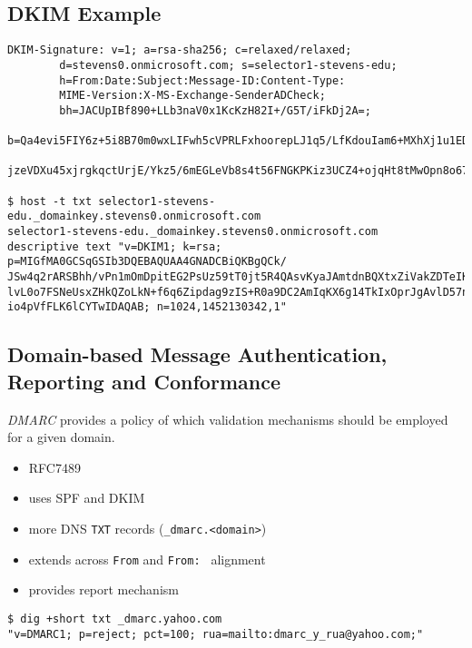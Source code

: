 \documentclass[xga]{xdvislides}
\begin{document}
\subsection{DKIM Example}
\begin{verbatim}
DKIM-Signature: v=1; a=rsa-sha256; c=relaxed/relaxed;                                               
        d=stevens0.onmicrosoft.com; s=selector1-stevens-edu;                                        
        h=From:Date:Subject:Message-ID:Content-Type:
        MIME-Version:X-MS-Exchange-SenderADCheck;       
        bh=JACUpIBf890+LLb3naV0x1KcKzH82I+/G5T/iFkDj2A=;                                            
        b=Qa4evi5FIY6z+5i8B70m0wxLIFwh5cVPRLFxhoorepLJ1q5/LfKdouIam6+MXhXj1u1EDmG
        jzeVDXu45xjrgkqctUrjE/Ykz5/6mEGLeVb8s4t56FNGKPKiz3UCZ4+ojqHt8tMwOpn8o675Kwa68nCISUP9I740jd0V6eLRNGSQ=                  

$ host -t txt selector1-stevens-edu._domainkey.stevens0.onmicrosoft.com
selector1-stevens-edu._domainkey.stevens0.onmicrosoft.com
descriptive text "v=DKIM1; k=rsa; p=MIGfMA0GCSqGSIb3DQEBAQUAA4GNADCBiQKBgQCk/
JSw4q2rARSBhh/vPn1mOmDpitEG2PsUz59tT0jt5R4QAsvKyaJAmtdnBQXtxZiVakZDTeIKY9gpZ4
lvL0o7FSNeUsxZHkQZoLkN+f6q6Zipdag9zIS+R0a9DC2AmIqKX6g14TkIxOprJgAvlD57nCGyX8L
io4pVfFLK6lCYTwIDAQAB; n=1024,1452130342,1"
\end{verbatim}
\vspace{.5in}

\subsection{Domain-based Message Authentication, Reporting and Conformance}
{\em DMARC} provides a policy of which validation
mechanisms should be employed for a given domain.

\begin{itemize}
	\item RFC7489
	\item uses SPF and DKIM
	\item more DNS {\tt TXT} records (\verb+_dmarc.<domain>+)
	\item extends across {\tt From} and {\tt From: } alignment
	\item provides report mechanism
\end{itemize}
\vspace{.25in}

\begin{verbatim}
$ dig +short txt _dmarc.yahoo.com
"v=DMARC1; p=reject; pct=100; rua=mailto:dmarc_y_rua@yahoo.com;"
\end{verbatim}
\end{document}
